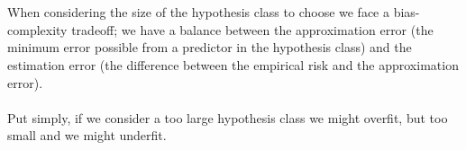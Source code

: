 \documentclass{article}
\begin{document}
\begin{enumerate}
\begin{enumerate}[label=\alph*.]
\begin{enumerate}
        \\\\
        When considering the size of the hypothesis class to choose we face a bias-complexity tradeoff; we have a balance between the approximation error (the minimum error possible from a predictor in the hypothesis class) and the estimation error (the difference between the empirical risk and the approximation error).
        \\\\
        Put simply, if we consider a too large hypothesis class we might overfit, but too small and we might underfit.
    \end{enumerate}
\end{enumerate}
\end{enumerate}
\end{document}
